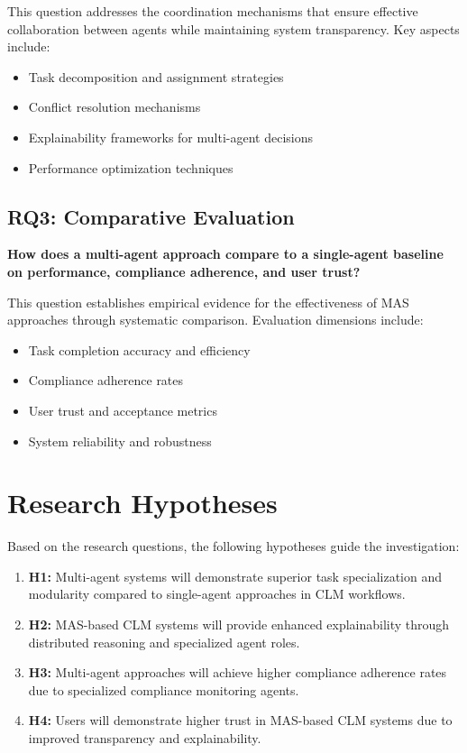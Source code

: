 This question addresses the coordination mechanisms that ensure effective collaboration between agents while maintaining system transparency. Key aspects include:
\begin{itemize}
    \item Task decomposition and assignment strategies
    \item Conflict resolution mechanisms
    \item Explainability frameworks for multi-agent decisions
    \item Performance optimization techniques
\end{itemize}

\subsection{RQ3: Comparative Evaluation}
\textbf{How does a multi-agent approach compare to a single-agent baseline on performance, compliance adherence, and user trust?}

This question establishes empirical evidence for the effectiveness of MAS approaches through systematic comparison. Evaluation dimensions include:
\begin{itemize}
    \item Task completion accuracy and efficiency
    \item Compliance adherence rates
    \item User trust and acceptance metrics
    \item System reliability and robustness
\end{itemize}

\section{Research Hypotheses}

Based on the research questions, the following hypotheses guide the investigation:

\begin{enumerate}
    \item \textbf{H1:} Multi-agent systems will demonstrate superior task specialization and modularity compared to single-agent approaches in CLM workflows.
    
    \item \textbf{H2:} MAS-based CLM systems will provide enhanced explainability through distributed reasoning and specialized agent roles.
    
    \item \textbf{H3:} Multi-agent approaches will achieve higher compliance adherence rates due to specialized compliance monitoring agents.
    
    \item \textbf{H4:} Users will demonstrate higher trust in MAS-based CLM systems due to improved transparency and explainability.
\end{enumerate}

